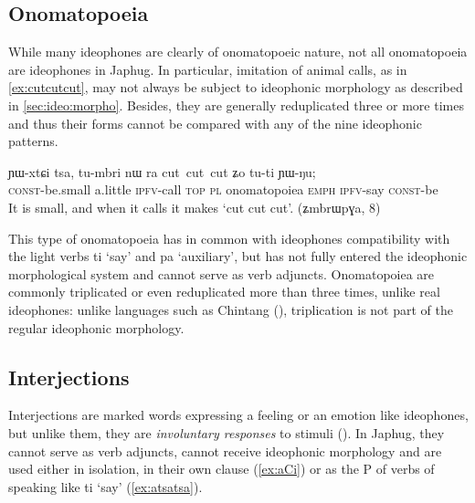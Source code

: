 \documentclass[oldfontcommands,oneside,a4paper,11pt]{article}
\newcommand{\ipa}[1]{{\phon \mbox{#1}}} %
\begin{document}
 \subsection{Onomatopoeia}
While many ideophones are clearly of onomatopoeic nature, not all onomatopoeia are ideophones in Japhug. In particular, imitation of animal calls, as in \ref{ex:cutcutcut}, may not always be subject  to  ideophonic morphology as described in \ref{sec:ideo:morpho}. Besides, they are generally reduplicated three or more times and thus their forms cannot be compared with any of the nine ideophonic patterns.

     \begin{exe}
\ex \label{ex:cutcutcut}
\gll 
 	\ipa{ɲɯ-xtɕi} 	\ipa{tsa,} 	\ipa{tu-mbri} 	\ipa{nɯ} \ipa{ra} 	\ipa{cut cut cut} \ipa{ʑo} 	\ipa{tu-ti} 	\ipa{ɲɯ-ŋu;} \\
\textsc{const}-be.small a.little \textsc{ipfv}-call \textsc{top} \textsc{pl} onomatopoiea \textsc{emph} \textsc{ipfv}-say \textsc{const}-be \\
\glt It is small, and when it calls it makes `cut cut cut'. (ʑmbrɯpɣa, 8)
\end{exe}
 
 This type of onomatopoeia has in common with   ideophones   compatibility with the light verbs \ipa{ti} `say' and \ipa{pa} `auxiliary', but has not fully entered the ideophonic morphological system and cannot serve as verb adjuncts. Onomatopoiea are commonly triplicated or even reduplicated more than three times, unlike real ideophones:  unlike languages such as Chintang (\citealt{rai06triplication}), triplication is not part of the regular ideophonic morphology.
 
 \subsection{Interjections}
 
 Interjections are marked words   expressing a feeling or an emotion   like ideophones, but unlike them, they are \textit{involuntary responses} to stimuli   (\citealt{dingemanse11phd}). In Japhug, they cannot serve as verb adjuncts, cannot receive ideophonic morphology and are used either in isolation, in their own clause (\ref{ex:aCi}) or as the P of verbs of speaking like \ipa{ti} `say' (\ref{ex:atsatsa}). 
\end{document}
